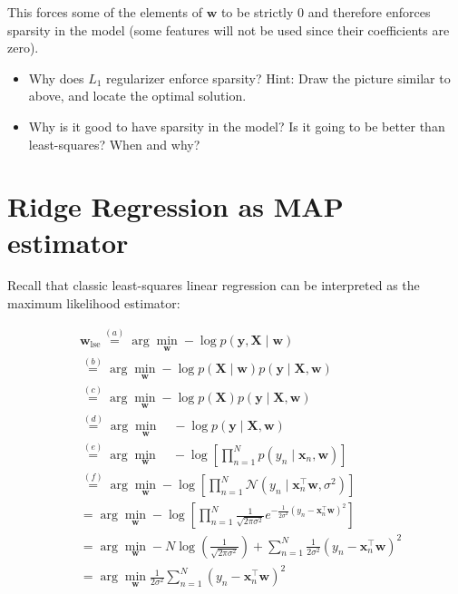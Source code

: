This forces some of the elements of $\mathbf{w}$ to be strictly 0 and therefore enforces sparsity in the model (some features will not be used since their coefficients are zero).

\begin{itemize}
  \item Why does $L_{1}$ regularizer enforce sparsity? Hint: Draw the picture similar to above, and locate the optimal solution.
  \item Why is it good to have sparsity in the model? Is it going to be better than least-squares? When and why?
\end{itemize}

\section*{Ridge Regression as MAP estimator}
Recall that classic least-squares linear regression can be interpreted as the maximum likelihood estimator:

$$
\begin{aligned}
& \mathbf{w}_{\mathrm{lse}} \stackrel{(a)}{=} \arg \min _{\mathbf{w}}-\log p(\mathbf{y}, \mathbf{X} \mid \mathbf{w}) \\
& \stackrel{(b)}{=} \arg \min _{\mathbf{w}}-\log p(\mathbf{X} \mid \mathbf{w}) p(\mathbf{y} \mid \mathbf{X}, \mathbf{w}) \\
& \stackrel{(c)}{=} \arg \min _{\mathbf{w}}-\log p(\mathbf{X}) p(\mathbf{y} \mid \mathbf{X}, \mathbf{w}) \\
& \stackrel{(d)}{=} \arg \min _{\mathbf{w}} \quad-\log p(\mathbf{y} \mid \mathbf{X}, \mathbf{w}) \\
& \stackrel{(e)}{=} \arg \min _{\mathbf{w}} \quad-\log \left[\prod_{n=1}^{N} p\left(y_{n} \mid \mathbf{x}_{n}, \mathbf{w}\right)\right] \\
& \stackrel{(f)}{=} \arg \min _{\mathbf{w}}-\log \left[\prod_{n=1}^{N} \mathcal{N}\left(y_{n} \mid \mathbf{x}_{n}^{\top} \mathbf{w}, \sigma^{2}\right)\right] \\
& =\arg \min _{\mathbf{w}}-\log \left[\prod_{n=1}^{N} \frac{1}{\sqrt{2 \pi \sigma^{2}}} e^{-\frac{1}{2 \sigma^{2}}\left(y_{n}-\mathbf{x}_{n}^{\top} \mathbf{w}\right)^{2}}\right] \\
& =\arg \min _{\mathbf{w}}-N \log \left(\frac{1}{\sqrt{2 \pi \sigma^{2}}}\right)+\sum_{n=1}^{N} \frac{1}{2 \sigma^{2}}\left(y_{n}-\mathbf{x}_{n}^{\top} \mathbf{w}\right)^{2} \\
& =\arg \min _{\mathbf{w}} \frac{1}{2 \sigma^{2}} \sum_{n=1}^{N}\left(y_{n}-\mathbf{x}_{n}^{\top} \mathbf{w}\right)^{2}
\end{aligned}
$$

